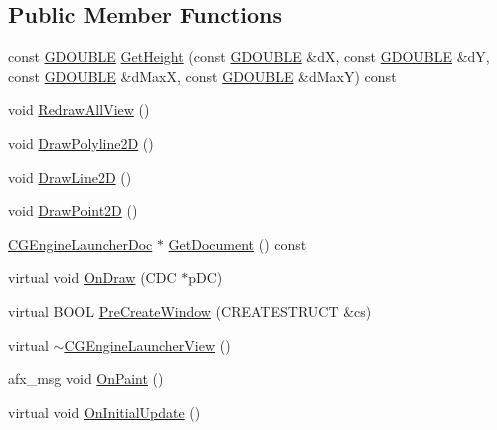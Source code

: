 \subsection*{Public Member Functions}
\begin{DoxyCompactItemize}
\item 
const \hyperlink{_g_types_8h_afd05ac85f90ee8e2a733928545462cd4}{G\+D\+O\+U\+B\+L\+E} \hyperlink{class_c_g_engine_launcher_view_afc6c1a257ed66eb0a055341d3043972f}{Get\+Height} (const \hyperlink{_g_types_8h_afd05ac85f90ee8e2a733928545462cd4}{G\+D\+O\+U\+B\+L\+E} \&d\+X, const \hyperlink{_g_types_8h_afd05ac85f90ee8e2a733928545462cd4}{G\+D\+O\+U\+B\+L\+E} \&d\+Y, const \hyperlink{_g_types_8h_afd05ac85f90ee8e2a733928545462cd4}{G\+D\+O\+U\+B\+L\+E} \&d\+Max\+X, const \hyperlink{_g_types_8h_afd05ac85f90ee8e2a733928545462cd4}{G\+D\+O\+U\+B\+L\+E} \&d\+Max\+Y) const 
\item 
void \hyperlink{class_c_g_engine_launcher_view_a3622ba238e44fa97c5e22b24389e2d47}{Redraw\+All\+View} ()
\item 
void \hyperlink{class_c_g_engine_launcher_view_a9e44702d0d8c09b794fde036b3f60cd8}{Draw\+Polyline2\+D} ()
\item 
void \hyperlink{class_c_g_engine_launcher_view_afb072fa0f4d56599635f173e6655d3d0}{Draw\+Line2\+D} ()
\item 
void \hyperlink{class_c_g_engine_launcher_view_afcfcce939a68b42de8b09b601684a899}{Draw\+Point2\+D} ()
\item 
\hyperlink{class_c_g_engine_launcher_doc}{C\+G\+Engine\+Launcher\+Doc} $\ast$ \hyperlink{class_c_g_engine_launcher_view_a0b910e8aec56e90e333eba7466d09e9a}{Get\+Document} () const 
\item 
virtual void \hyperlink{class_c_g_engine_launcher_view_ae946d06ec8a2bae1f32145d71637b4be}{On\+Draw} (C\+D\+C $\ast$p\+D\+C)
\item 
virtual B\+O\+O\+L \hyperlink{class_c_g_engine_launcher_view_aabf2253be3e468e4b4c427ca84c17cbd}{Pre\+Create\+Window} (C\+R\+E\+A\+T\+E\+S\+T\+R\+U\+C\+T \&cs)
\item 
virtual \hyperlink{class_c_g_engine_launcher_view_a3928e7aa0d06e5fba458c90792b937ed}{$\sim$\+C\+G\+Engine\+Launcher\+View} ()
\item 
afx\+\_\+msg void \hyperlink{class_c_g_engine_launcher_view_a5701ce0fd45e1d51e0151aa1756dd778}{On\+Paint} ()
\item 
virtual void \hyperlink{class_c_g_engine_launcher_view_a80401cd004d17058f929e3f85835c26b}{On\+Initial\+Update} ()
\item 

\end{DoxyCompactItemize}
